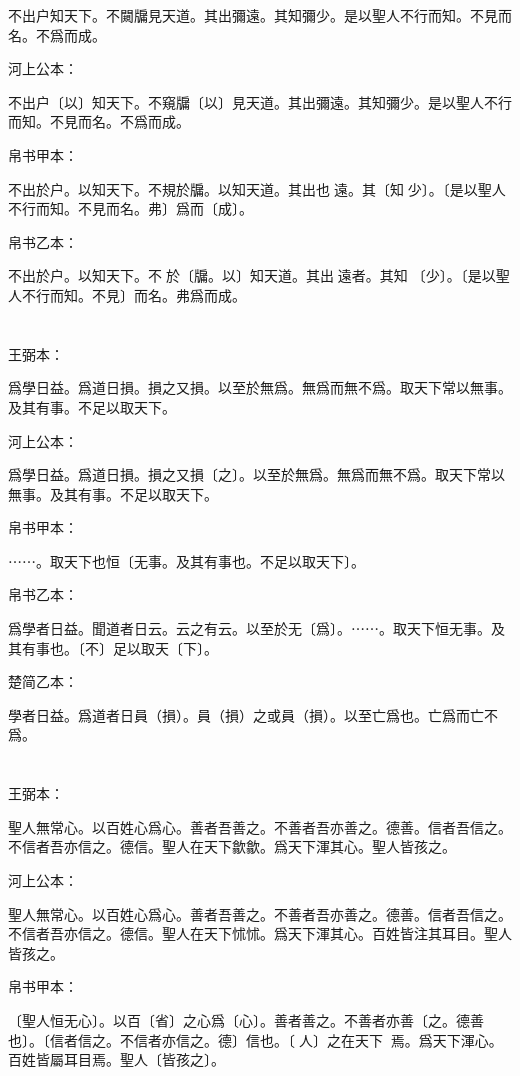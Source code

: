 \documentclass[a5paper]{ctexbook}
\begin{document}
    不出户知天下。不闚牖見天道。其出彌遠。其知彌少。是以聖人不行而知。不見而名。不爲而成。

    河上公本：

    不出户〔以〕知天下。不窺牖〔以〕見天道。其出彌遠。其知彌少。是以聖人不行而知。不見而名。不爲而成。

    帛书甲本：

    不出於户。以知天下。不規於牖。以知天道。其出也𢑃遠。其〔知󱁁少〕。〔是以聖人不行而知。不見而名。弗〕爲而〔成〕。

    帛书乙本：

    不出於户。以知天下。不𧠹於〔牖。以〕知天道。其出󱁁遠者。其知󱁁〔少〕。〔是以聖人不行而知。不見〕而名。弗爲而成。

    \chapter{}
    王弼本：

    爲學日益。爲道日損。損之又損。以至於無爲。無爲而無不爲。取天下常以無事。及其有事。不足以取天下。

    河上公本：

    爲學日益。爲道日損。損之又損〔之〕。以至於無爲。無爲而無不爲。取天下常以無事。及其有事。不足以取天下。

    帛书甲本：

    ⋯⋯。取天下也恒〔无事。及其有事也。不足以取天下〕。

    帛书乙本：

    爲學者日益。聞道者日云。云之有云。以至於无〔爲〕。⋯⋯。取天下恒无事。及其有事也。〔不〕足以取天〔下〕。

    楚简乙本：

    學者日益。爲道者日員（損）。員（損）之或員（損）。以至亡爲也。亡爲而亡不爲。

    \chapter{}
    王弼本：

    聖人無常心。以百姓心爲心。善者吾善之。不善者吾亦善之。德善。信者吾信之。不信者吾亦信之。德信。聖人在天下歙歙。爲天下渾其心。聖人皆孩之。

    河上公本：

    聖人無常心。以百姓心爲心。善者吾善之。不善者吾亦善之。德善。信者吾信之。不信者吾亦信之。德信。聖人在天下怵怵。爲天下渾其心。百姓皆注其耳目。聖人皆孩之。

    帛书甲本：

    〔聖人恒无心〕。以百〔省〕之心爲〔心〕。善者善之。不善者亦善〔之。德善也〕。〔信者信之。不信者亦信之。德〕信也。〔𦔻人〕之在天下𢡁𢡁焉。爲天下渾心。百姓皆屬耳目焉。聖人〔皆孩之〕。
\end{document}
